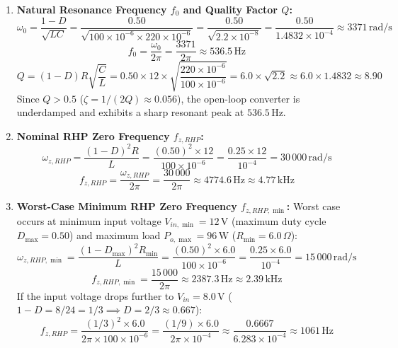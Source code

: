 \begin{enumerate}
  \item \textbf{Natural Resonance Frequency $f_0$ and Quality Factor $Q$:}
  \begin{equation}
  \omega_0 = \frac{1-D}{\sqrt{LC}} = \frac{0.50}{\sqrt{100 \times 10^{-6} \times 220 \times 10^{-6}}} = \frac{0.50}{\sqrt{2.2 \times 10^{-8}}} = \frac{0.50}{1.4832 \times 10^{-4}} \approx 3371\,\si{\radian\per\second}
  \end{equation}
  \begin{equation}
  f_0 = \frac{\omega_0}{2\pi} = \frac{3371}{2\pi} \approx 536.5\,\si{\hertz}
  \end{equation}
  \begin{equation}
  Q = (1-D) R \sqrt{\frac{C}{L}} = 0.50 \times 12 \times \sqrt{\frac{220 \times 10^{-6}}{100 \times 10^{-6}}} = 6.0 \times \sqrt{2.2} \approx 6.0 \times 1.4832 \approx 8.90
  \end{equation}
  Since $Q > 0.5$ ($\zeta = 1/(2Q) \approx 0.056$), the open-loop converter is underdamped and exhibits a sharp resonant peak at $536.5\,\si{\hertz}$.

  \item \textbf{Nominal RHP Zero Frequency $f_{z,RHP}$:}
  \begin{equation}
  \omega_{z,RHP} = \frac{(1-D)^2 R}{L} = \frac{(0.50)^2 \times 12}{100 \times 10^{-6}} = \frac{0.25 \times 12}{10^{-4}} = 30\,000\,\si{\radian\per\second}
  \end{equation}
  \begin{equation}
  f_{z,RHP} = \frac{\omega_{z,RHP}}{2\pi} = \frac{30\,000}{2\pi} \approx 4774.6\,\si{\hertz} \approx 4.77\,\si{\kilo\hertz}
  \end{equation}

  \item \textbf{Worst-Case Minimum RHP Zero Frequency $f_{z,RHP,\min}$:}
  Worst case occurs at minimum input voltage $V_{in,\min} = 12\,\si{\volt}$ (maximum duty cycle $D_{\max} = 0.50$) and maximum load $P_{o,\max} = 96\,\si{\watt}$ ($R_{\min} = 6.0\,\Omega$):
  \begin{equation}
  \omega_{z,RHP,\min} = \frac{(1 - D_{\max})^2 R_{\min}}{L} = \frac{(0.50)^2 \times 6.0}{100 \times 10^{-6}} = \frac{0.25 \times 6.0}{10^{-4}} = 15\,000\,\si{\radian\per\second}
  \end{equation}
  \begin{equation}
  \boxed{f_{z,RHP,\min} = \frac{15\,000}{2\pi} \approx 2387.3\,\si{\hertz} \approx 2.39\,\si{\kilo\hertz}}
  \end{equation}
  If the input voltage drops further to $V_{in} = 8.0\,\si{\volt}$ ($1 - D = 8/24 = 1/3 \implies D = 2/3 \approx 0.667$):
  \begin{equation}
  f_{z,RHP} = \frac{(1/3)^2 \times 6.0}{2\pi \times 100 \times 10^{-6}} = \frac{(1/9) \times 6.0}{2\pi \times 10^{-4}} \approx \frac{0.6667}{6.283 \times 10^{-4}} \approx 1061\,\si{\hertz}
  \end{equation}


\end{enumerate}
